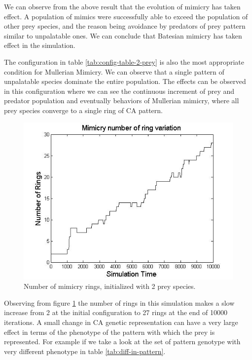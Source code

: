 We can observe from the above result that the evolution of mimicry has taken effect. A population of mimics were successfully able to exceed the population of other prey species, and the reason being avoidance by predators of prey pattern similar to unpalatable ones. We can conclude that Batesian mimicry has taken effect in the simulation.

The configuration in table \ref{tab:config-table-2-prey} is also the most appropriate condition for Mullerian Mimicry. We can observe that a single pattern of unpalatable species dominate the entire population. The effects can be observed in this configuration where we can see the continuous increment of prey and predator population and eventually behaviors of Mullerian mimicry, where all prey species converge to a single ring of CA pattern.

\begin{figure}[H]
	\centering
	\includegraphics[scale=0.50]{images/ringSize10k-2Prey}
	\caption[Number of mimicry rings (2 prey species)]{Number of mimicry rings, initialized with 2 prey species.}
	\label{fig:ringSize10k-2Prey}
\end{figure}

Observing from figure \ref{fig:ringSize10k-2Prey} the number of rings in this simulation makes a slow increase from 2 at the initial configuration to 27 rings at the end of 10000 iterations. A small change in CA genetic representation can have a very large effect in terms of the phenotype of the pattern with which the prey is represented. For example if we take a look at the set of pattern genotype with very different phenotype in table \ref{tab:diff-in-pattern}.

